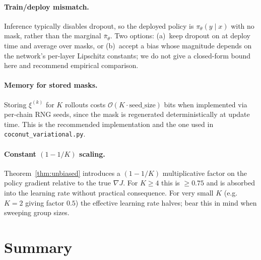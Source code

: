 \documentclass[11pt]{article}
\theoremstyle{definition}
\theoremstyle{remark}
\begin{document}
\paragraph{Train/deploy mismatch.}
Inference typically disables dropout, so the deployed policy is
$\pi_\theta(y\mid x)$ with no mask, rather than the marginal
$\bar\pi_\theta$.  Two options: (a)~keep dropout on at deploy time and
average over masks, or (b)~accept a bias whose magnitude depends on the
network's per-layer Lipschitz constants; we do not give a closed-form
bound here and recommend empirical comparison.

\paragraph{Memory for stored masks.}
Storing $\xi^{(k)}$ for $K$ rollouts costs $\mathcal{O}(K \cdot
\mathrm{seed\_size})$ bits when implemented via per-chain RNG seeds, since
the mask is regenerated deterministically at update time.  This is the
recommended implementation and the one used in
\texttt{coconut\_variational.py}.

\paragraph{Constant $(1 - 1/K)$ scaling.}
Theorem~\ref{thm:unbiased} introduces a $(1 - 1/K)$ multiplicative factor
on the policy gradient relative to the true $\nabla J$.  For $K \ge 4$
this is $\ge 0.75$ and is absorbed into the learning rate without
practical consequence.  For very small $K$ (e.g.\ $K = 2$ giving factor
$0.5$) the effective learning rate halves; bear this in mind when
sweeping group sizes.

\section{Summary}
\end{document}
